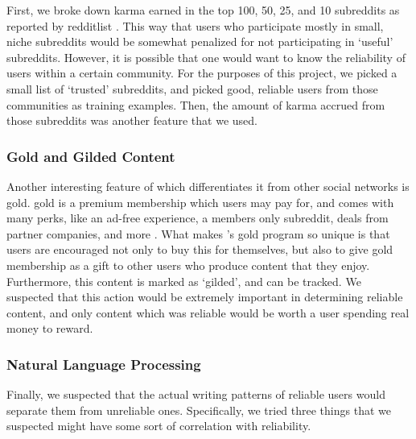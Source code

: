 First, we broke down karma earned in the top 100, 50, 25, and 10 subreddits as
reported by redditlist \cite{redditlist}. This way that users who participate
mostly in small, niche subreddits would be somewhat penalized for not
participating in `useful' subreddits. However, it is possible that one would
want to know the reliability of users within a certain community. For the
purposes of this project, we picked a small list of `trusted' subreddits, and
picked good, reliable users from those communities as training examples. Then,
the amount of karma accrued from those subreddits was another feature that we
used.


\subsubsection{\reddit{} Gold and Gilded Content} %
\label{ssub:reddit_gold_and_gilded_content}

Another interesting feature of \reddit{} which differentiates it from other
social networks is \reddit{} gold. \reddit{} gold is a premium membership which
users may pay for, and comes with many perks, like an ad-free experience, a
members only subreddit, deals from partner companies, and more
\cite{redditgold}. What makes \reddit{}'s gold program so unique is that users
are encouraged not only to buy this for themselves, but also to give \reddit{}
gold membership as a gift to other users who produce content that they enjoy.
Furthermore, this content is marked as `gilded', and can be tracked. We
suspected that this action would be extremely important in determining reliable
content, and only content which was reliable would be worth a user spending real
money to reward.



\subsubsection{Natural Language Processing} %
\label{ssub:natural_language_processing}

Finally, we suspected that the actual writing patterns of reliable users would
separate them from unreliable ones. Specifically, we tried three things that we
suspected might have some sort of correlation with reliability.


